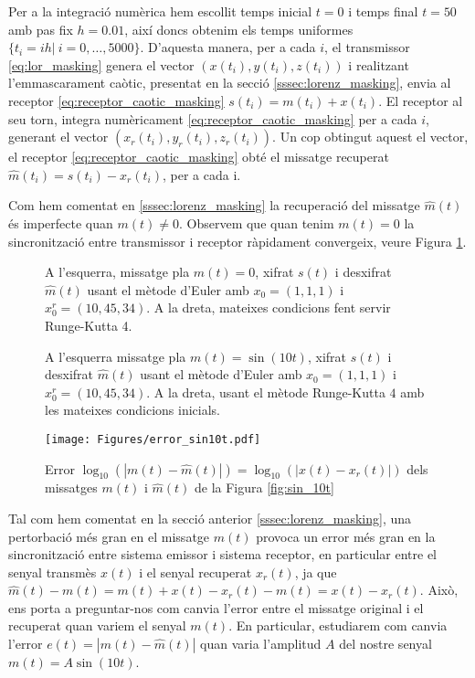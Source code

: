 \documentclass[11pt,a4paper,openright,oneside]{article}
\numberwithin{equation}{section}
\theoremstyle{definition}
\begin{document}
Per a la integració numèrica hem escollit temps inicial $t=0$ i temps final $t = 50$ amb pas fix $h=0.01$, així doncs obtenim els temps uniformes $\{t_i=ih| \ i=0,\ldots,5000\}$. D'aquesta manera, per a cada $i$, el transmissor \eqref{eq:lor_masking} genera el vector $\left(x(t_i), y(t_i),z(t_i)\right)$ i realitzant l'emmascarament caòtic, presentat en la secció \ref{sssec:lorenz_masking}, envia al receptor \eqref{eq:receptor_caotic_masking} $s(t_i)=m(t_i)+x(t_i)$. El receptor al seu torn, integra numèricament \eqref{eq:receptor_caotic_masking} per a cada $i$, generant el vector $\left(x_r(t_i),y_r(t_i),z_r(t_i)\right)$. Un cop obtingut aquest el vector, el receptor \eqref{eq:receptor_caotic_masking} obté el missatge recuperat $\hat{m}(t_i)=s(t_i)-x_r(t_i)$, per a cada i.

Com hem comentat en \ref{sssec:lorenz_masking} la recuperació del missatge $\hat{m}(t)$ és imperfecte quan $m(t)\neq 0$. Observem que quan tenim $m(t)=0$ la sincronització entre transmissor i receptor ràpidament convergeix, veure Figura \ref{fig:missatge_0}. 

\begin{figure}[htbp]
    \centering
    \qquad
    \caption{A l'esquerra, missatge pla $m(t)=0$, xifrat $s(t)$ i desxifrat $\hat{m}(t)$ usant el mètode d'Euler amb $x_0=(1,1,1)$ i $x_0^r=(10, 45, 34)$. A la dreta, mateixes condicions fent servir Runge-Kutta 4.}
    \label{fig:missatge_0}
\end{figure} 

\begin{figure}[htpb]
    \centering
    \qquad
    \caption{A l'esquerra missatge pla $m(t)=\sin(10t)$, xifrat $s(t)$ i desxifrat $\hat{m}(t)$ usant el mètode d'Euler amb $x_0=(1,1,1)$ i $x_0^r=(10, 45, 34)$. A la dreta, usant el mètode Runge-Kutta $4$ amb les mateixes condicions inicials.}
    \label{fig:sin_10t}
    \break
    \texttt{[image: Figures/error\_sin10t.pdf]}
    \caption{Error $\log_{10}(|m(t)-\hat{m}(t)|)=\log_{10}(|x(t)-x_r(t)|)$ dels missatges $m(t)$ i $\hat{m}(t)$ de la Figura \ref{fig:sin_10t}}
    \label{fig:error_eul_rung}
\end{figure} 

Tal com hem comentat en la secció anterior \ref{sssec:lorenz_masking}, una pertorbació més gran en el missatge $m(t)$ provoca un error més gran en la sincronització entre sistema emissor i sistema receptor, en particular entre el senyal transmès $x(t)$ i el senyal recuperat $x_r(t)$, ja que $\hat{m}(t)-m(t)=m(t)+x(t)-x_r(t)-m(t)=x(t)-x_r(t)$. Això, ens porta a preguntar-nos com canvia l'error entre el missatge original i el recuperat quan variem el senyal $m(t)$. En particular, estudiarem com canvia l'error $e(t)=|m(t)-\hat{m}(t)|$ quan varia l'amplitud $A$ del nostre senyal $m(t)=A\sin(10t)$. 
\end{document}
